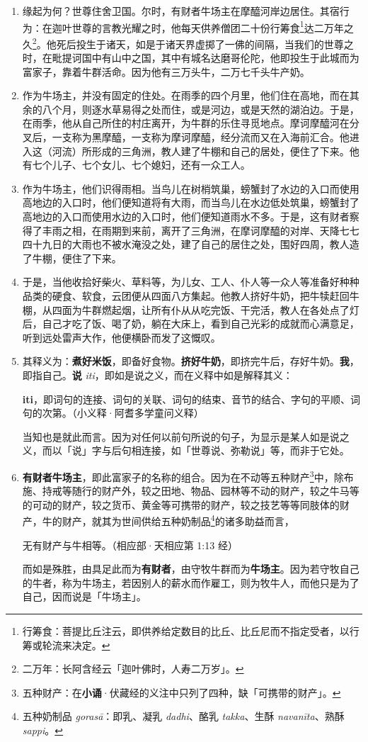 \begin{enumerate}\item 缘起为何？世尊住舍卫国。尔时，有财者牛场主在摩醯河岸边居住。其宿行为：在迦叶世尊的言教光耀之时，他每天供养僧团二十份行筹食\footnote{行筹食：菩提比丘注云，即供养给定数目的比丘、比丘尼而不指定受者，以行筹或轮流来决定。}达二万年之久\footnote{二万年：长阿含经云「迦叶佛时，人寿二万岁」。}。他死后投生于诸天，如是于诸天界虚掷了一佛的间隔，当我们的世尊之时，在毗提诃国中有山中之国，其中有城名达磨哥伦陀，他即投生于此城而为富家子，靠着牛群活命。因为他有三万头牛，二万七千头牛产奶。
\item 作为牛场主，并没有固定的住处。在雨季的四个月里，他们住在高地，而在其余的八个月，则逐水草易得之处而住，或是河边，或是天然的湖泊边。于是，在雨季，他从自己所住的村庄离开，为牛群的乐住寻觅地点。摩诃摩醯河在分叉后，一支称为黑摩醯，一支称为摩诃摩醯，经分流而又在入海前汇合。他进入这（河流）所形成的三角洲，教人建了牛棚和自己的居处，便住了下来。他有七个儿子、七个女儿、七个媳妇，还有一众工人。
\item 作为牛场主，他们识得雨相。当鸟儿在树梢筑巢，螃蟹封了水边的入口而使用高地边的入口时，他们便知道将有大雨，而当鸟儿在水边低处筑巢，螃蟹封了高地边的入口而使用水边的入口时，他们便知道雨水不多。于是，这有财者察得了丰雨之相，在雨期到来前，离开了三角洲，在摩诃摩醯的对岸、天降七七四十九日的大雨也不被水淹没之处，建了自己的居住之处，围好四周，教人造了牛棚，便住了下来。
\item 于是，当他收拾好柴火、草料等，为儿女、工人、仆人等一众人等准备好种种品类的硬食、软食，云团便从四面八方集起。他教人挤好牛奶，把牛犊赶回牛棚，从四面为牛群燃起烟，让所有仆从从吃完饭、干完活，教人在各处点了灯后，自己才吃了饭、喝了奶，躺在大床上，看到自己光彩的成就而心满意足，听到远处雷声大作，他便横卧而发了这慨叹。
\item 其释义为：\textbf{煮好米饭}，即备好食物。\textbf{挤好牛奶}，即挤完牛后，存好牛奶。\textbf{我}，即指自己。\textbf{说} \textit{iti}，即如是说之义，而在义释中如是解释其义：\begin{quoting}\textbf{iti}，即词句的连接、词句的关联、词句的结束、音节的结合、字句的平顺、词句的次第。（小义释·阿耆多学童问义释）\end{quoting}当知也是就此而言。因为对任何以前句所说的句子，为显示是某人如是说之义，而以「说」字与后句相连接，如「世尊说、弥勒说」等，而非于它处。
\item \textbf{有财者牛场主}，即此富家子的名称的组合。因为在不动等五种财产\footnote{五种财产：在\textbf{小诵}·伏藏经的义注中只列了四种，缺「可携带的财产」。}中，除布施、持戒等随行的财产外，较之田地、物品、园林等不动的财产，较之牛马等的可动的财产，较之货币、黄金等可携带的财产，较之技艺等等同肢体的财产，牛的财产，就其为世间供给五种奶制品\footnote{五种奶制品 \textit{gorasā}：即乳、凝乳 \textit{dadhi}、酪乳 \textit{takka}、生酥 \textit{navanīta}、熟酥 \textit{sappi}。}的诸多助益而言，\begin{quoting}无有财产与牛相等。（相应部·天相应第 1:13 经）\end{quoting}而如是殊胜，由具足此而为\textbf{有财者}，由守牧牛群而为\textbf{牛场主}。因为若守牧自己的牛者，称为牛场主，若因别人的薪水而作雇工，则为牧牛人，而他只是为了自己，因而说是「牛场主」。

\end{enumerate}
